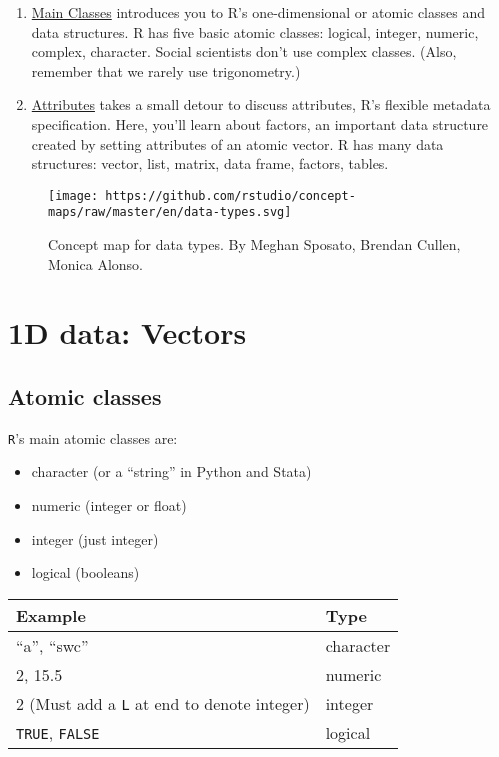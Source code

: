 \documentclass[
]{book}
\providecommand{\tightlist}{%
  \setlength{\itemsep}{0pt}\setlength{\parskip}{0pt}}
\begin{document}
\begin{enumerate}
\def\labelenumi{\arabic{enumi}.}
\item
  \protect\hyperlink{main-classes}{Main Classes} introduces you to R's one-dimensional or atomic classes and data structures. R has five basic atomic classes: logical, integer, numeric, complex, character. Social scientists don't use complex classes. (Also, remember that we rarely use trigonometry.)
\item
  \protect\hyperlink{attributes}{Attributes} takes a small detour to discuss attributes, R's flexible metadata specification. Here, you'll learn about factors, an important data structure created by setting attributes of an atomic vector. R has many data structures: vector, list, matrix, data frame, factors, tables.
\end{enumerate}

\begin{figure}
\centering
\texttt{[image: https://github.com/rstudio/concept-maps/raw/master/en/data-types.svg]}
\caption{Concept map for data types. By Meghan Sposato, Brendan Cullen, Monica Alonso.}
\end{figure}

\hypertarget{d-data-vectors}{%
\section{1D data: Vectors}\label{d-data-vectors}}

\hypertarget{atomic-classes}{%
\subsection{Atomic classes}\label{atomic-classes}}

\texttt{R}'s main atomic classes are:

\begin{itemize}
\tightlist
\item
  character (or a ``string'' in Python and Stata)
\item
  numeric (integer or float)
\item
  integer (just integer)
\item
  logical (booleans)
\end{itemize}

\begin{longtable}[]{@{}ll@{}}
\toprule
Example & Type \\
\midrule
\endhead
``a'', ``swc'' & character \\
2, 15.5 & numeric \\
2 (Must add a \texttt{L} at end to denote integer) & integer \\
\texttt{TRUE}, \texttt{FALSE} & logical \\
\bottomrule
\end{longtable}
\end{document}
